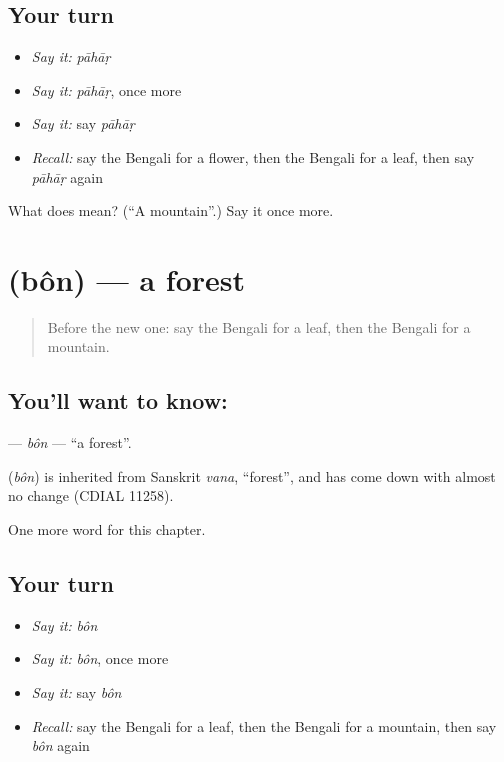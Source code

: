 \subsection*{Your turn}
\begin{itemize}
\raggedright
  \item \emph{Say it:} \emph{pāhāṛ}
  \item \emph{Say it:} \emph{pāhāṛ}, once more
  \item \emph{Say it:} say \emph{pāhāṛ}
  \item \emph{Recall:} say the Bengali for a flower, then the Bengali for a leaf, then say \emph{pāhāṛ} again
\end{itemize}

\begin{tcolorbox}[breakable,colback=teal!4,colframe=teal!35!black,title={Before you move on}]
What does  mean? (\textquotedblleft{}A mountain\textquotedblright{}.) Say it once more.
\end{tcolorbox}
\section[\texorpdfstring{\bn{বন} (bôn)}{বন (bôn)}]{ (bôn) — a forest}

\label{lesson:BN-C66-bon}



\begin{quote}
Before the new one: say the Bengali for a leaf, then the Bengali for a mountain.
\end{quote}

\subsection*{You'll want to know: }
\textbf{} — \emph{bôn} — \textquotedblleft{}a forest\textquotedblright{}.

\begin{cousinweb}
\textbf{} (\emph{bôn}) is inherited from Sanskrit \emph{vana}, \textquotedblleft{}forest\textquotedblright{}, and has come down with almost no change (CDIAL 11258).
\end{cousinweb}

\begin{grammarlens}[title={What you've built}]
One more word for this chapter.
\end{grammarlens}

\subsection*{Your turn}
\begin{itemize}
\raggedright
  \item \emph{Say it:} \emph{bôn}
  \item \emph{Say it:} \emph{bôn}, once more
  \item \emph{Say it:} say \emph{bôn}
  \item \emph{Recall:} say the Bengali for a leaf, then the Bengali for a mountain, then say \emph{bôn} again
\end{itemize}


